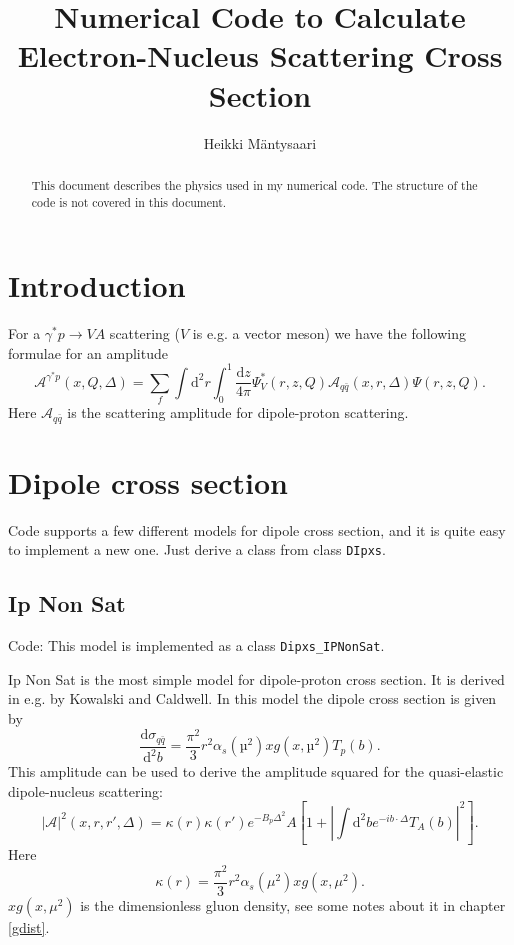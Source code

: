 \documentclass[a4paper,12pt,twoside]{article}
\title{Numerical Code to Calculate Electron-Nucleus Scattering Cross Section}
\author{Heikki Mäntysaari}
\date{}
\newcommand{\code}[1]{\texttt{#1}}
\newcommand{\der}{\mathrm{d}}
\newcommand{\A}{\mathcal{A}}
\begin{document}
 
\maketitle
\begin{abstract}
This document describes the physics used in my numerical code. The structure of the code is not covered in this document.
\end{abstract}

\section{Introduction}
For a $\gamma^*p \rightarrow VA$ scattering ($V$ is e.g. a vector meson) we have the following formulae for an amplitude \cite{Caldwell:2009ke}
\begin{equation}
	\A^{\gamma^* p}(x,Q,\Delta) =	\sum_f \int \der^2 r \int_0^1 \frac{\der z}{4\pi} \Psi_V^*(r,z,Q) \A_{q\bar q}(x,r,\Delta) \Psi(r,z,Q).
\end{equation}
Here $\A_{q\bar q}$ is the scattering amplitude for dipole-proton scattering.

\section{Dipole cross section}
Code supports a few different models for dipole cross section, and it is quite easy to implement a new one. Just derive a class from class \code{DIpxs}.

\subsection{Ip Non Sat}
Code: This model is implemented as a class \code{Dipxs\_IPNonSat}.

Ip Non Sat is the most simple model for dipole-proton cross section. It is derived in e.g. \cite{Caldwell:2009ke} by Kowalski and Caldwell. In this model the dipole cross section is given by
\begin{equation}
	\frac{\der \sigma_{q\bar q}}{\der^2 b} = \frac{\pi^2}{3}r^2 \alpha_s(µ^2)xg(x,µ^2) T_p(b). 
\end{equation}
This amplitude can be used to derive the amplitude squared for the quasi-elastic dipole-nucleus scattering:
\begin{equation}
	|\A|^2(x,r,r',\Delta) = \kappa(r) \kappa(r') e^{-B_p \Delta^2} A  \left[ 1 + \left| \int \der^2 b e^{-ib \cdot \Delta} T_A(b)\right|^2 \right] . 
\end{equation}
Here 
\begin{equation}
	\label{eq:kappa}
	\kappa(r) = \frac{\pi^2}{3}r^2\alpha_s(\mu^2)xg(x,\mu^2).
\end{equation}
$xg(x,\mu^2)$ is the dimensionless gluon density, see some notes about it in chapter \ref{gdist}.
\end{document}

